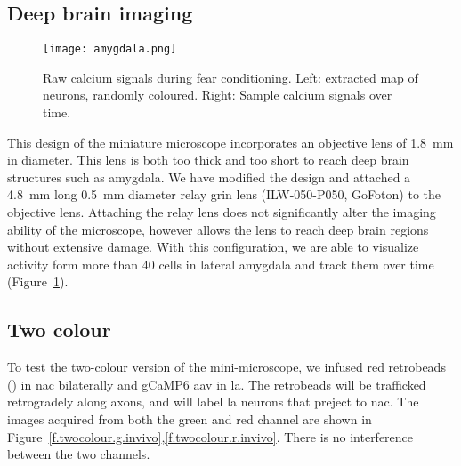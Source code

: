 \subsection{Deep brain imaging}
\begin{figure}[h]
    \centering
    \texttt{[image: amygdala.png]}
    \caption{Raw calcium signals during fear conditioning. Left: extracted map of neurons, randomly coloured. Right: Sample calcium signals over time.\label{f.amygdala}}

\end{figure}
This design of the miniature microscope incorporates an objective lens of \SI{1.8}{\mm} in diameter. This lens is both too thick and too short to reach deep brain structures such as amygdala. We have modified the design and attached a \SI{4.8}{\mm} long \SI{0.5}{\mm} diameter relay \gls{grin} lens (ILW-050-P050, GoFoton) to the objective lens. Attaching the relay lens does not significantly alter the imaging ability of the microscope, however allows the lens to reach deep brain regions without extensive damage. With this configuration, we are able to visualize activity form more than 40 cells in lateral amygdala and track them over time (Figure~\ref{f.amygdala}).


\subsection{Two colour}
To test the two-colour version of the mini-microscope, we infused red retrobeads () in \gls{nac} bilaterally and gCaMP6 \gls{aav} in \gls{la}. The retrobeads will be trafficked retrogradely along axons, and will label \gls{la} neurons that preject to \gls{nac}. The images acquired from both the green and red channel are shown in Figure~\ref{f.twocolour.g.invivo},\ref{f.twocolour.r.invivo}. There is no interference between the two channels.

